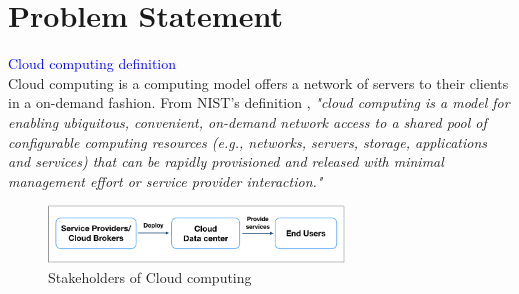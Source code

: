 \section{Problem Statement}


\textcolor{Blue}{Cloud computing definition}\\
Cloud computing is a computing model offers a network of servers to their 
clients in a on-demand fashion. From NIST's definition \cite{Mell:2011jj}, \textit{"cloud computing is a model for enabling ubiquitous, convenient, on-demand network access to a shared pool of configurable computing resources (e.g., networks, servers, storage, applications and services) that can be rapidly provisioned and released with minimal management effort or service provider interaction."}

\begin{figure}
	\centering
	\includegraphics[width=0.7\textwidth]{pics/stakeholders.png}
	\caption{Stakeholders of Cloud computing}
	\label{fig:stakeholders}
\end{figure}

